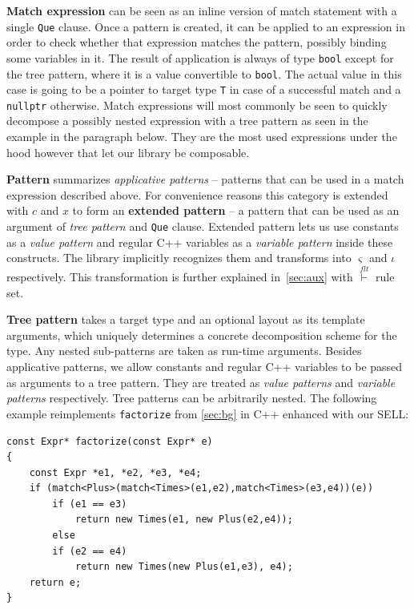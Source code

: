 \documentclass[preprint]{sigplanconf}
\makeatletter
\DeclareRobustCommand{\code}[1]{{\lstinline[breaklines=false,escapechar=@]{#1}}}
\makeatother
\begin{document}
{\bf Match expression} can be seen as an inline version of match statement with 
a single \code{Que} clause. Once a pattern is created, it can be applied to an 
expression in order to check whether that expression matches the pattern, 
possibly binding some variables in it. The result of application is always of 
type \code{bool} except for the tree pattern, where it is a value convertible to 
\code{bool}. The actual value in this case is going to be a pointer to target 
type \code{T} in case of a successful match and a \code{nullptr} otherwise. 
Match expressions will most commonly be seen to quickly decompose a possibly 
nested expression with a tree pattern as seen in the example in the paragraph 
below. They are the most used expressions under the hood however that let our 
library be composable. 

{\bf Pattern} summarizes \emph{applicative patterns} -- patterns that can be 
used in a match expression described above. For convenience reasons this 
category is extended with $c$ and $x$ to form an {\bf extended pattern} -- a
pattern that can be used as an argument of \emph{tree pattern} and \code{Que} 
clause. Extended pattern lets us use constants as a \emph{value pattern} and 
regular C++ variables as a \emph{variable pattern} inside these constructs. The 
library implicitly recognizes them and transforms into $\varsigma$ and $\iota$ 
respectively. This transformation is further explained in~\textsection\ref{sec:aux} 
with $\stackrel{flt}{\vdash}$ rule set.

{\bf Tree pattern} takes a target type and an optional layout as its template 
arguments, which uniquely determines a concrete decomposition scheme for the 
type. Any nested sub-patterns are taken as run-time arguments. Besides 
applicative patterns, we allow constants and regular C++ variables to be passed 
as arguments to a tree pattern. They are treated as \emph{value patterns} and 
\emph{variable patterns} respectively. Tree patterns can be arbitrarily nested. 
The following example reimplements \code{factorize} from 
\textsection\ref{sec:bg} in C++ enhanced with our SELL:

\begin{lstlisting}
const Expr* factorize(const Expr* e)
{
    const Expr *e1, *e2, *e3, *e4;
    if (match<Plus>(match<Times>(e1,e2),match<Times>(e3,e4))(e))
        if (e1 == e3)
            return new Times(e1, new Plus(e2,e4));
        else
        if (e2 == e4)
            return new Times(new Plus(e1,e3), e4);
    return e;
}
\end{lstlisting}
\end{document}
